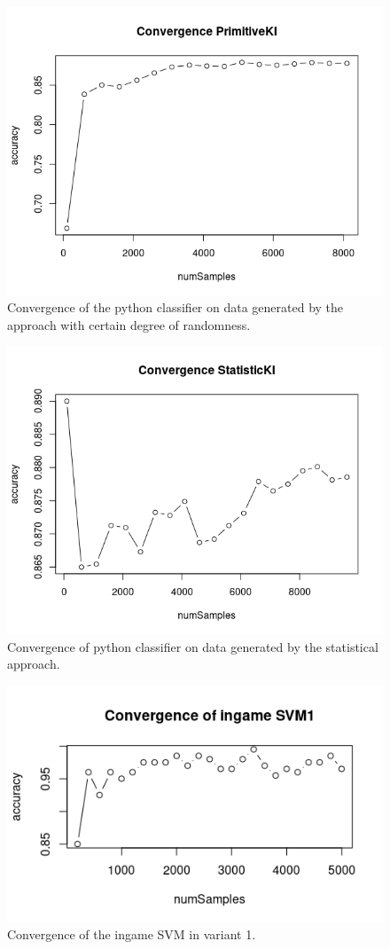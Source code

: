 \documentclass[11pt]{article}
\begin{document}
\begin{figure}[H]
	\centering
	\includegraphics[width=.45\textwidth]{../testdata/conv_prim.png}
	\caption{Convergence of the python classifier on data generated by the approach with certain degree of randomness.}
	\label{fig:conv_prim}
\end{figure}
\begin{figure}[H]
	\centering
	\includegraphics[width=.45\textwidth]{../testdata/conv_stat.png}
	\caption{Convergence of python classifier on data generated by the statistical approach.}
	\label{fig:conv_stat}
\end{figure}

\begin{figure}[H]
	\centering
	\includegraphics[width=.45\textwidth]{../testdata/conv_ingameSVM1.png}
	\caption{Convergence of the ingame SVM in variant 1.}
	\label{fig:conv_ingameSVM1}
\end{figure}
\end{document}
